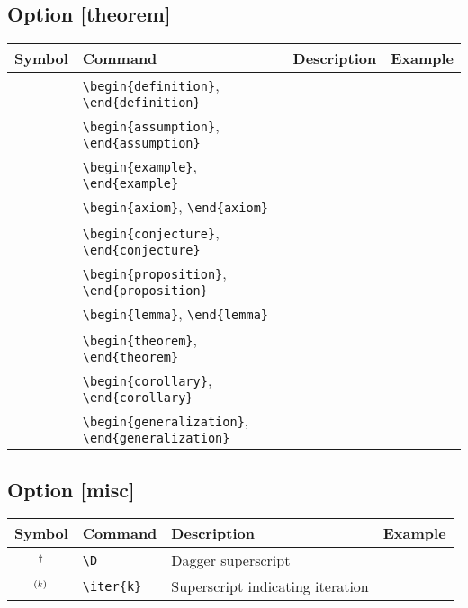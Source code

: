 \documentclass{article}
\begin{document}
\subsection*{Option [theorem]}

\begin{tabular}{clll}
  \toprule
  Symbol & Command & Description & Example \\
  \midrule
  & \verb|\begin{definition}|, \verb|\end{definition}| & \\
  & \verb|\begin{assumption}|, \verb|\end{assumption}| & \\
  & \verb|\begin{example}|, \verb|\end{example}| & \\
  \midrule
  & \verb|\begin{axiom}|, \verb|\end{axiom}| & \\
  & \verb|\begin{conjecture}|, \verb|\end{conjecture}| & \\
  & \verb|\begin{proposition}|, \verb|\end{proposition}| & \\
  & \verb|\begin{lemma}|, \verb|\end{lemma}| & \\
  & \verb|\begin{theorem}|, \verb|\end{theorem}| & \\
  & \verb|\begin{corollary}|, \verb|\end{corollary}| & \\
  & \verb|\begin{generalization}|, \verb|\end{generalization}| & \\
  \bottomrule
\end{tabular}

\subsection*{Option [misc]}

\begin{tabular}{clll}
  \toprule
  Symbol & Command & Description & Example \\
  \midrule
  $^{\dag}$ & \verb|\D| & Dagger superscript \\
  $^{(k)}$ & \verb|\iter{k}| & Superscript indicating iteration \\
  \bottomrule
\end{tabular}
\end{document}
